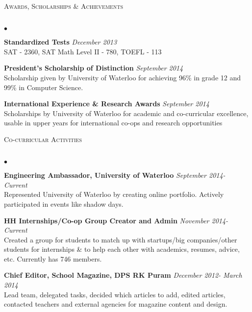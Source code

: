 \documentclass[10pt]{article}
\newcommand{\lineunder}{\vspace*{-8pt} \\ \hspace*{-18pt} \hrulefill \\}
\newcommand{\header}[1]{{\hspace*{-15pt}\vspace*{6pt} \textsc{#1}} \vspace*{-6pt} \lineunder}
\newenvironment{achievements}{\begin{list}{$\bullet$}{\topsep 0pt \itemsep -1.5pt \leftmargin 5pt}}{\vspace*{4pt}\end{list}}
\begin{document}
\vspace{5pt}

\header{\normalsize Awards, Scholarships \& Achievements}
\begin{achievements}
\item \textbf{Standardized Tests} \hfill \textit {December 2013}
\\ SAT - 2360, SAT Math Level II - 780, TOEFL - 113 
\item \textbf{President's Scholarship of Distinction} \hfill \textit {September 2014}
\\ Scholarship given by University of Waterloo for achieving 96\% in grade 12 and 99\% in Computer Science.
\item \textbf{International Experience \& Research Awards} \hfill \textit {September 2014}
\\ Scholarships by University of Waterloo for academic and co-curricular excellence, usable in upper years for international co-ops and research opportunities
\end{achievements}

\vspace{5pt}

\header{\normalsize Co-curricular Activities}
\begin{achievements}
\item \textbf{Engineering Ambassador, University of Waterloo} \hfill \textit {September 2014- Current}
\\ Represented University of Waterloo by creating online portfolio. Actively participated in events like shadow days.
\item \textbf{HH Internships/Co-op Group Creator and Admin} \hfill \textit {November 2014- Current}
\\ Created a group for students to match up with startups/big companies/other students for internships \& to help each other with academics, resumes, advice, etc. Currently has 746 members.
\item \textbf{Chief Editor, School Magazine, DPS RK Puram} \hfill \textit {December 2012- March 2014}
\\ Lead team, delegated tasks, decided which articles to add, edited articles, contacted teachers and external agencies for magazine content and design.
\end{achievements}

\vspace{5pt}
\end{document}
